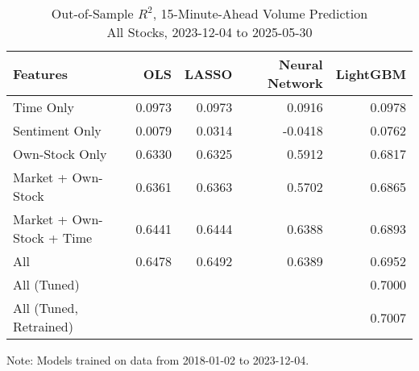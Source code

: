 \begin{table}[H]
\caption{
{ Out-of-Sample $R^2$, 15-Minute-Ahead Volume Prediction} \\
{\small All Stocks, 2023-12-04 to 2025-05-30}
} 

\fontsize{12.0pt}{14.4pt}\selectfont

\begin{tabular*}{\linewidth}{@{\extracolsep{\fill}}lrrrr}
\toprule
Features & OLS & LASSO & Neural Network & LightGBM \\ 
\midrule\addlinespace[2.5pt]
Time Only & 0.0973 & 0.0973 & 0.0916 & 0.0978 \\
Sentiment Only & 0.0079 & 0.0314 & -0.0418 & 0.0762 \\
Own-Stock Only & 0.6330 & 0.6325 & 0.5912 & 0.6817 \\
Market + Own-Stock & 0.6361 & 0.6363 & 0.5702 & 0.6865 \\
Market + Own-Stock + Time & 0.6441 & 0.6444 & 0.6388 & 0.6893 \\
All & 0.6478 & 0.6492 & 0.6389 & 0.6952 \\
All (Tuned) &  &  &  & 0.7000 \\
All (Tuned, Retrained) &  &  &  & 0.7007 \\
\bottomrule
\end{tabular*}
\begin{minipage}{\linewidth}
Note: Models trained on data from 2018-01-02 to 2023-12-04.\\
\end{minipage}
\end{table}
